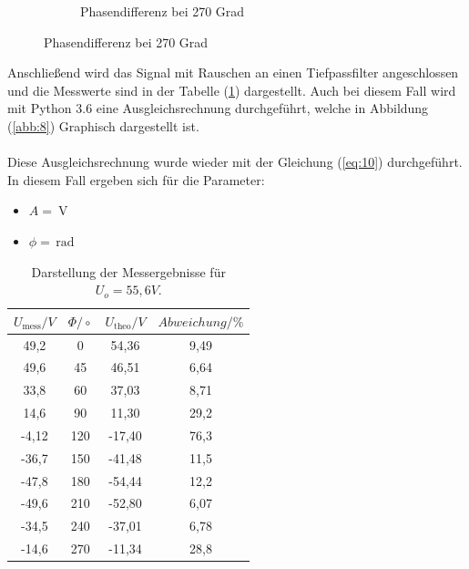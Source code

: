 \begin{figure}[H]
\begin{subfigure}{0.48\textwidth}
  \caption{Phasendifferenz bei 270 Grad}
\end{subfigure}
\end{figure}

Anschließend wird das Signal mit Rauschen an einen Tiefpassfilter angeschlossen und die
Messwerte sind in der Tabelle (\ref{tab:2}) dargestellt.
Auch bei diesem Fall wird mit Python 3.6 eine Ausgleichsrechnung durchgeführt,
welche in Abbildung (\ref{abb:8}) Graphisch dargestellt ist.\\\\

Diese Ausgleichsrechnung wurde wieder mit der Gleichung (\ref{eq:10}) durchgeführt.
In diesem Fall ergeben sich für die Parameter:

\begin{itemize}
	\item $A = \SI{}{\volt}$
	\item $\phi = \num{} \, \text{rad}$
\end{itemize}

\begin{table}[H]
\centering
\caption{Darstellung der Messergebnisse für $U_o =55,6 V$.}
\label{tab:2}
 \begin{tabular}{c c c c}
  \toprule
     $U_\text{mess} / V$ & $\Phi/\circ$ & $U_\text{theo} / V$ & $Abweichung/ \%$ \\
  \midrule
  49,2  & 0  & 	54,36 & 9,49 \\
  49,6  & 45 &  46,51 & 6,64 \\
  33,8  & 60 &  37,03 & 8,71 \\
  14,6  & 90 &  11,30 & 29,2 \\
  -4,12 & 120& -17,40 & 76,3 \\
  -36,7 & 150& -41,48 & 11,5 \\
  -47,8 & 180& -54,44 & 12,2 \\
  -49,6 & 210& -52,80 & 6,07 \\
  -34,5 & 240& -37,01 & 6,78 \\
  -14,6 & 270& -11,34 & 28,8 \\
  \bottomrule
\end{tabular}
\end{table}

